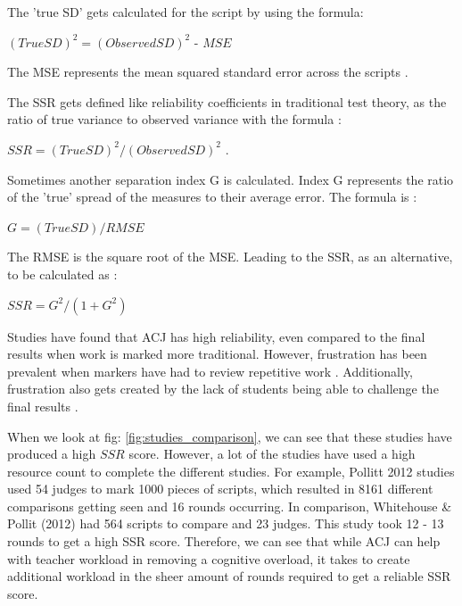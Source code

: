 		The 'true SD' gets calculated for the script by using the formula:
			\begin{center}
				$(True SD)^{2} = (Observed SD)^{2} \text{ - } MSE$
			\end{center}
		 
		The MSE represents the mean squared standard error across the scripts \cite{ bramley2015investigating}. 
		
		The SSR gets defined like reliability coefficients in traditional test theory, as the ratio of true variance to observed variance with the formula \cite{ bramley2015investigating}: 
		\begin{center}
			
		$SSR = (True SD)^{2} / (Observed SD)^{2}$ .
		\end{center}
		Sometimes another separation index G is calculated. Index G represents the ratio of the 'true' spread of the measures to their average error. The formula is \cite{ bramley2015investigating}: 
		\begin{center}
			$G = (True SD) / RMSE$
		\end{center}
		The RMSE is the square root of the MSE. Leading to the SSR, as an alternative, to be calculated as \cite{ bramley2015investigating}:
		\begin{center}
			$SSR = G^2 / (1+G^2 )$
		\end{center}
	
		Studies have found that ACJ has high reliability, even compared to the final results when work is marked more traditional. However,  frustration has been prevalent when markers have had to review repetitive work \cite{bartholomew2019tool}. Additionally, frustration also gets created by the lack of students being able to challenge the final results \cite{bartholomew2019tool}. 
		
		When we look at fig: \ref{fig:studies_comparison}, we can see that these studies have produced a high $SSR$ score. However, a lot of the studies have used a high resource count to complete the different studies. For example, Pollitt 2012 studies used 54 judges to mark 1000 pieces of scripts, which resulted in 8161 different comparisons getting seen and 16 rounds occurring. In comparison, Whitehouse \& Pollit (2012) had 564 scripts to compare and 23 judges. This study took 12 - 13 rounds to get a high SSR score. Therefore, we can see that while ACJ can help with teacher workload in removing a cognitive overload, it takes to create additional workload in the sheer amount of rounds required to get a reliable SSR score.
		
